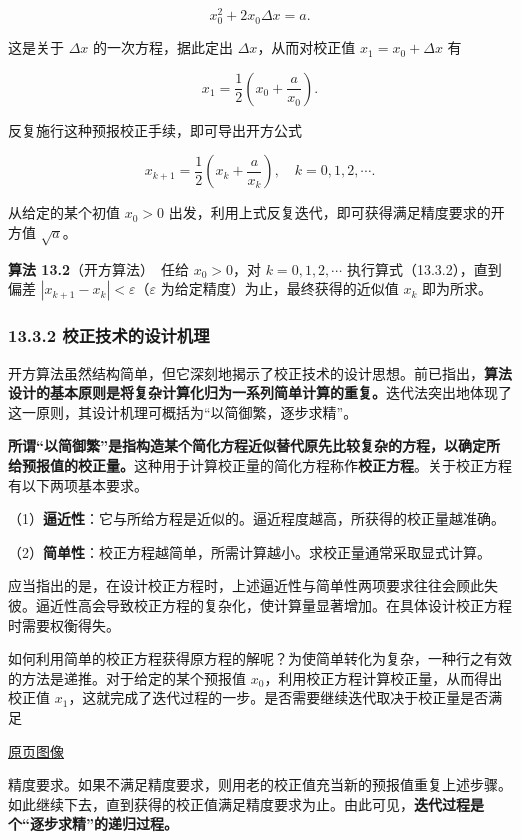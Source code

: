 \documentclass[
  10pt,
  fontset=fandol]{ctexart}
\begin{document}
\[
x_0^2+2x_0\Delta x=a.
\]

这是关于 \(\Delta x\) 的一次方程，据此定出 \(\Delta x\)，从而对校正值 \(x_1=x_0+\Delta x\) 有

\[
x_1=\frac{1}{2}\left(x_0+\frac{a}{x_0}\right).
\]

反复施行这种预报校正手续，即可导出开方公式

\[
x_{k+1}=\frac{1}{2}\left(x_k+\frac{a}{x_k}\right),\quad k=0,1,2,\cdots.
\tag{13.3.2}
\]

从给定的某个初值 \(x_0>0\) 出发，利用上式反复迭代，即可获得满足精度要求的开方值 \(\sqrt{a}\)。

\textbf{算法 13.2}（开方算法）　任给 \(x_0>0\)，对 \(k=0,1,2,\cdots\) 执行算式（13.3.2），直到偏差 \(|x_{k+1}-x_k|<\varepsilon\)（\(\varepsilon\) 为给定精度）为止，最终获得的近似值 \(x_k\) 即为所求。

\subsubsection{13.3.2 校正技术的设计机理}\label{ux6821ux6b63ux6280ux672fux7684ux8bbeux8ba1ux673aux7406}

开方算法虽然结构简单，但它深刻地揭示了校正技术的设计思想。前已指出，\textbf{算法设计的基本原则是将复杂计算化归为一系列简单计算的重复。}迭代法突出地体现了这一原则，其设计机理可概括为``以简御繁，逐步求精''。

\textbf{所谓``以简御繁''是指构造某个简化方程近似替代原先比较复杂的方程，以确定所给预报值的校正量。}这种用于计算校正量的简化方程称作\textbf{校正方程}。关于校正方程有以下两项基本要求。

（1）\textbf{逼近性}：它与所给方程是近似的。逼近程度越高，所获得的校正量越准确。

（2）\textbf{简单性}：校正方程越简单，所需计算越小。求校正量通常采取显式计算。

应当指出的是，在设计校正方程时，上述逼近性与简单性两项要求往往会顾此失彼。逼近性高会导致校正方程的复杂化，使计算量显著增加。在具体设计校正方程时需要权衡得失。

如何利用简单的校正方程获得原方程的解呢？为使简单转化为复杂，一种行之有效的方法是递推。对于给定的某个预报值 \(x_0\)，利用校正方程计算校正量，从而得出校正值 \(x_1\)，这就完成了迭代过程的一步。是否需要继续迭代取决于校正量是否满足

\href{../../source-images/pdf-313.jpeg}{原页图像}

精度要求。如果不满足精度要求，则用老的校正值充当新的预报值重复上述步骤。如此继续下去，直到获得的校正值满足精度要求为止。由此可见，\textbf{迭代过程是个``逐步求精''的递归过程。}
\end{document}
